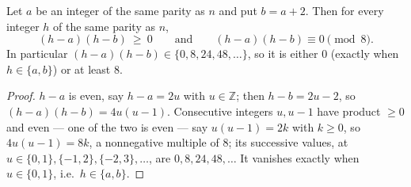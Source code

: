\documentclass[12pt]{article}
\begin{document}
\begin{lemma}\label{lem:quant}
Let $a$ be an integer of the same parity as $n$ and put $b=a+2$. Then for
every integer $h$ of the same parity as $n$,
\[
(h-a)(h-b)\ \ge\ 0
\qquad\text{and}\qquad
(h-a)(h-b)\equiv0 \pmod 8 .
\]
In particular $(h-a)(h-b)\in\{0,8,24,48,\ldots\}$, so it is either $0$
(exactly when $h\in\{a,b\}$) or at least $8$.
\end{lemma}
\begin{proof}
$h-a$ is even, say $h-a=2u$ with $u\in\mathbb{Z}$; then $h-b=2u-2$, so
$(h-a)(h-b)=4u(u-1)$. Consecutive integers $u,u-1$ have product $\ge0$ and even --- one of
the two is even --- say $u(u-1)=2k$ with $k\ge0$, so $4u(u-1)=8k$, a
nonnegative multiple of $8$; its successive values, at
$u\in\{0,1\},\{-1,2\},\{-2,3\},\ldots$, are $0,8,24,48,\ldots$ It
vanishes exactly when $u\in\{0,1\}$, i.e.\ $h\in\{a,b\}$.
\end{proof}
\end{document}
